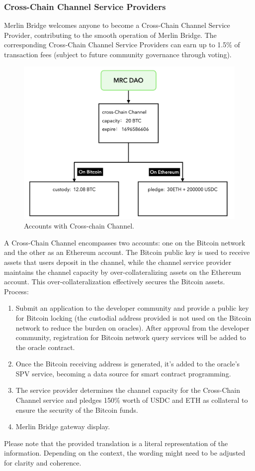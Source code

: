 \documentclass{article}
\begin{document}
\subsubsection{Cross-Chain Channel Service Providers}
Merlin Bridge welcomes anyone to become a Cross-Chain Channel Service Provider, contributing to the smooth operation of Merlin Bridge. The corresponding Cross-Chain Channel Service Providers can earn up to 1.5\% of transaction fees (subject to future community governance through voting).
\begin{figure}[h]
\centering
\includegraphics[width=1\textwidth]{services.png}
\caption{\label{fig:services}Accounts with Cross-chain Channel.}
\end{figure}
\par A Cross-Chain Channel encompasses two accounts: one on the Bitcoin network and the other as an Ethereum account. The Bitcoin public key is used to receive assets that users deposit in the channel, while the channel service provider maintains the channel capacity by over-collateralizing assets on the Ethereum account. This over-collateralization effectively secures the Bitcoin assets.\\
Process:
\begin{enumerate}
    \item Submit an application to the developer community and provide a public key for Bitcoin locking (the custodial address provided is not used on the Bitcoin network to reduce the burden on oracles). After approval from the developer community, registration for Bitcoin network query services will be added to the oracle contract.
    \item Once the Bitcoin receiving address is generated, it's added to the oracle's SPV service, becoming a data source for smart contract programming.
    \item The service provider determines the channel capacity for the Cross-Chain Channel service and pledges 150\% worth of USDC and ETH as collateral to ensure the security of the Bitcoin funds.
    \item Merlin Bridge gateway display.
\end{enumerate}
\par Please note that the provided translation is a literal representation of the information. Depending on the context, the wording might need to be adjusted for clarity and coherence.
\end{document}
